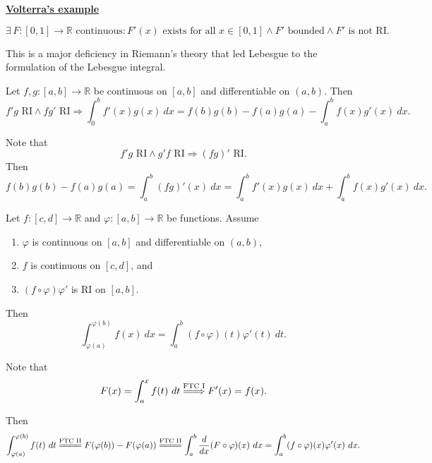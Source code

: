 \documentclass{notes}
\begin{document}
{\boldmath \bfseries \underline{Volterra's example}}

\[
  \exists \, F \colon [0, 1] \to \mathbb R \text{ continuous}: \text{$F'(x)$ exists for all $x \in [0, 1]$} \land \text{$F'$ bounded} \land \text{$F'$ is not RI}.
\]

This is a major deficiency in Riemann's theory that led Lebesgue to the formulation of the Lebesgue integral.

\begin{cor}
  Let $f, g \colon [a, b] \to \mathbb R$ be continuous on $[a, b]$ and differentiable on $(a, b)$.
  Then 
  \[
    \text{$f' g$ RI} \land \text{$f g'$ RI} \Rightarrow \int_0^b f'(x) g(x)\ dx = f(b) g(b) - f(a) g(a) - \int_a^b f(x) g'(x)\ dx.
  \]
\end{cor}

\begin{prf}
  Note that 
  \[
    \text{$f' g$ RI} \land \text{$g' f$ RI} \Rightarrow \text{$(f g)'$ RI}.
  \]
  Then 
  \[
    f(b) g(b) - f(a) g(a) = \int_a^b (f g)'(x)\ dx = \int_a^b f'(x) g(x)\ dx + \int_a^b f(x) g'(x)\ dx.
  \]
\end{prf}

\begin{cor}
  Let $f \colon [c, d] \to \mathbb R$ and $\varphi \colon [a, b] \to \mathbb R$ be functions.
  Assume 
  \begin{enumerate}
    \item $\varphi$ is continuous on $[a, b]$ and differentiable on $(a, b)$, 

    \item $f$ is continuous on $[c, d]$, and

    \item $(f \circ \varphi) \varphi'$ is RI on $[a, b]$.
  \end{enumerate}
  Then 
  \[
    \int_{\varphi(a)}^{\varphi(b)} f(x)\ dx = \int_a^b (f \circ \varphi)(t) \varphi'(t)\ dt.
  \]
\end{cor}

\begin{prf}
  Note that 
  \[
    F(x) = \int_a^x f(t)\ dt \overset{\text{FTC I}}{=\joinrel\Longrightarrow} F'(x) = f(x).
  \]
  
  Then 
  \[
    \int_{\varphi(a)}^{\varphi(b)} f(t)\ dt \overset{\text{FTC II}}{=\joinrel=\joinrel=\joinrel=} F(\varphi(b)) - F(\varphi(a)) \overset{\text{FTC II}}{=\joinrel=\joinrel=\joinrel=} \int_a^b \frac{d}{dx} (F \circ \varphi)(x)\ dx = \int_a^b (f \circ \varphi)(x) \varphi'(x)\ dx.
  \]
\end{prf}
\end{document}
